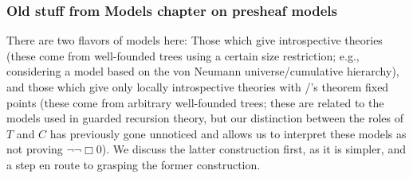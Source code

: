 \subsubsection{Old stuff from Models chapter on presheaf models}
There are two flavors of models here: Those which give introspective theories (these come from well-founded trees using a certain size restriction; e.g., considering a model based on the von Neumann universe/cumulative hierarchy), and those which give only locally introspective theories with \Loeb/'s theorem fixed points (these come from arbitrary well-founded trees; these are related to the models used in guarded recursion theory, but our distinction between the roles of $T$ and $C$ has previously gone unnoticed and allows us to interpret these models as not proving $\lnot \lnot \Box 0$). We discuss the latter construction first, as it is simpler, and a step en route to grasping the former construction.



